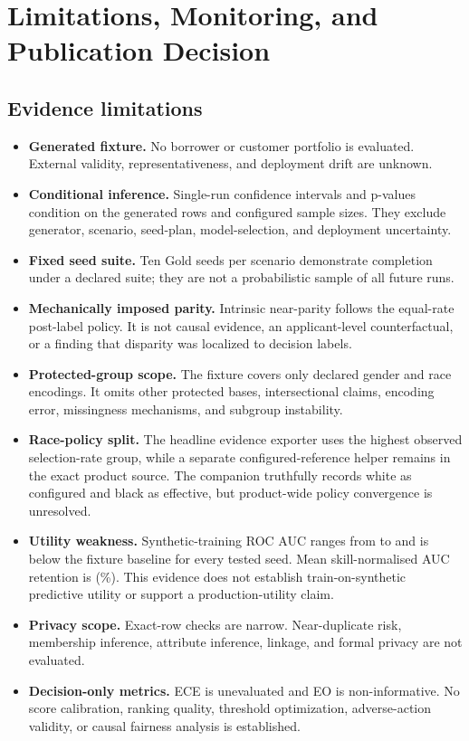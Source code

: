 \section{Limitations, Monitoring, and Publication Decision}
\label{sec:limitations}

\subsection{Evidence limitations}

\begin{itemize}
  \item \textbf{Generated fixture.} No borrower or customer portfolio is evaluated. External
        validity, representativeness, and deployment drift are unknown.
  \item \textbf{Conditional inference.} Single-run confidence intervals and p-values condition on
        the generated rows and configured sample sizes. They exclude generator, scenario,
        seed-plan, model-selection, and deployment uncertainty.
  \item \textbf{Fixed seed suite.} Ten Gold seeds per scenario demonstrate completion under a
        declared suite; they are not a probabilistic sample of all future runs.
  \item \textbf{Mechanically imposed parity.} Intrinsic near-parity follows the equal-rate
        post-label policy. It is not causal evidence, an applicant-level counterfactual, or a
        finding that disparity was localized to decision labels.
  \item \textbf{Protected-group scope.} The fixture covers only declared gender and race encodings.
        It omits other protected bases, intersectional claims, encoding error, missingness
        mechanisms, and subgroup instability.
  \item \textbf{Race-policy split.} The headline evidence exporter uses the highest observed
        selection-rate group, while a separate configured-reference helper remains in the exact
        product source. The companion truthfully records white as configured and black as
        effective, but product-wide policy convergence is unresolved.
  \item \textbf{Utility weakness.} Synthetic-training ROC AUC ranges from
        \UtilitySyntheticAUCMin{} to \UtilitySyntheticAUCMax{} and is below the fixture baseline
        for every tested seed. Mean skill-normalised AUC retention is
        \UtilitySkillRetentionMean{} (\UtilitySkillRetentionMeanPct{}\%). This evidence does not
        establish train-on-synthetic predictive utility or support a production-utility claim.
  \item \textbf{Privacy scope.} Exact-row checks are narrow. Near-duplicate risk, membership
        inference, attribute inference, linkage, and formal privacy are not evaluated.
  \item \textbf{Decision-only metrics.} ECE is unevaluated and EO is non-informative. No score
        calibration, ranking quality, threshold optimization, adverse-action validity, or causal
        fairness analysis is established.
\end{itemize}

